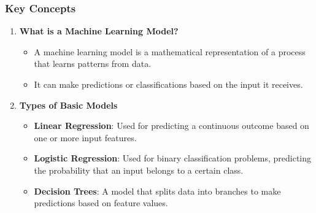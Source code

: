 \documentclass[aspectratio=169]{beamer}
\begin{document}
\begin{frame}[fragile]
    \frametitle{Key Concepts}
    \begin{enumerate}
        \item \textbf{What is a Machine Learning Model?}
            \begin{itemize}
                \item A machine learning model is a mathematical representation of a process that learns patterns from data.
                \item It can make predictions or classifications based on the input it receives.
            \end{itemize}
        
        \item \textbf{Types of Basic Models}
            \begin{itemize}
                \item \textbf{Linear Regression}: Used for predicting a continuous outcome based on one or more input features.
                \item \textbf{Logistic Regression}: Used for binary classification problems, predicting the probability that an input belongs to a certain class.
                \item \textbf{Decision Trees}: A model that splits data into branches to make predictions based on feature values.
            \end{itemize}
    \end{enumerate}
\end{frame}
\end{document}
